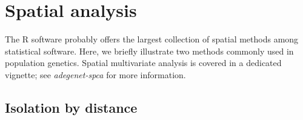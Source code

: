 \documentclass{article}
\begin{document}
\newpage
\section{Spatial analysis}

The R software probably offers the largest collection of spatial methods among statistical software.
Here, we briefly illustrate two methods commonly used in population genetics.
Spatial multivariate analysis is covered in a dedicated vignette; see \textit{adegenet-spca} for
more information.


\subsection{Isolation by distance}

\end{document}
